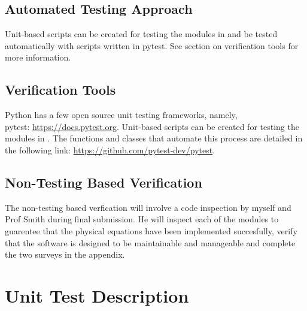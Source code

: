 \documentclass[12pt, titlepage]{article}
\begin{document}
\subsection{Automated Testing Approach}

Unit-based scripts can be created for testing the modules in \progname{}and be tested automatically with 
scripts written in pytest. See section on verification tools for more information.

\subsection{Verification Tools}

Python has a few open source unit testing frameworks, namely, \\pytest: \url{https://docs.pytest.org}. 
Unit-based scripts can be created for testing the modules in \progname. The functions and classes that automate 
this process are detailed in the following link: 
\url{https://github.com/pytest-dev/pytest}.\\

		

\subsection{Non-Testing Based Verification}

The non-testing based verfication will involve a code inspection by myself and
Prof Smith during final submission. He will inspect each of the modules to guarentee that the 
physical equations have been implemented succesfully, verify that the software 
is designed to be maintainable and manageable and complete the 
two surveys in the appendix.\\

\section{Unit Test Description}
\end{document}
